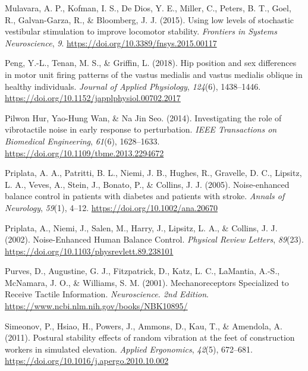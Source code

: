 \documentclass[]{cik}%
\newlength{\cslhangindent}
\newlength{\cslentryspacingunit} %
\newenvironment{CSLReferences}[2] %
 {%
  \setlength{\parindent}{0pt}
  \ifodd #1
  \let\oldpar\par
  \def\par{\hangindent=\cslhangindent\oldpar}
  \fi
  \setlength{\parskip}{#2\cslentryspacingunit}
 }%
 {}
\begin{document}
\begin{CSLReferences}{1}{0}
\leavevmode{}%
Mulavara, A. P., Kofman, I. S., De Dios, Y. E., Miller, C., Peters, B.
T., Goel, R., Galvan-Garza, R., \& Bloomberg, J. J. (2015). Using low
levels of stochastic vestibular stimulation to improve locomotor
stability. \emph{Frontiers in Systems Neuroscience}, \emph{9}.
\url{https://doi.org/10.3389/fnsys.2015.00117}

\leavevmode{}%
Peng, Y.-L., Tenan, M. S., \& Griffin, L. (2018). Hip position and sex
differences in motor unit firing patterns of the vastus medialis and
vastus medialis oblique in healthy individuals. \emph{Journal of Applied
Physiology}, \emph{124}(6), 1438--1446.
\url{https://doi.org/10.1152/japplphysiol.00702.2017}

\leavevmode{}%
Pilwon Hur, Yao-Hung Wan, \& Na Jin Seo. (2014). Investigating the role
of vibrotactile noise in early response to perturbation. \emph{IEEE
Transactions on Biomedical Engineering}, \emph{61}(6), 1628--1633.
\url{https://doi.org/10.1109/tbme.2013.2294672}

\leavevmode{}%
Priplata, A. A., Patritti, B. L., Niemi, J. B., Hughes, R., Gravelle, D.
C., Lipsitz, L. A., Veves, A., Stein, J., Bonato, P., \& Collins, J. J.
(2005). Noise-enhanced balance control in patients with diabetes and
patients with stroke. \emph{Annals of Neurology}, \emph{59}(1), 4--12.
\url{https://doi.org/10.1002/ana.20670}

\leavevmode{}%
Priplata, A., Niemi, J., Salen, M., Harry, J., Lipsitz, L. A., \&
Collins, J. J. (2002). Noise-Enhanced Human Balance Control.
\emph{Physical Review Letters}, \emph{89}(23).
\url{https://doi.org/10.1103/physrevlett.89.238101}

\leavevmode{}%
Purves, D., Augustine, G. J., Fitzpatrick, D., Katz, L. C., LaMantia,
A.-S., McNamara, J. O., \& Williams, S. M. (2001). Mechanoreceptors
Specialized to Receive Tactile Information. \emph{Neuroscience. 2nd
Edition}. \url{https://www.ncbi.nlm.nih.gov/books/NBK10895/}

\leavevmode{}%
Simeonov, P., Hsiao, H., Powers, J., Ammons, D., Kau, T., \& Amendola,
A. (2011). Postural stability effects of random vibration at the feet of
construction workers in simulated elevation. \emph{Applied Ergonomics},
\emph{42}(5), 672--681.
\url{https://doi.org/10.1016/j.apergo.2010.10.002}


\end{CSLReferences}
\end{document}
